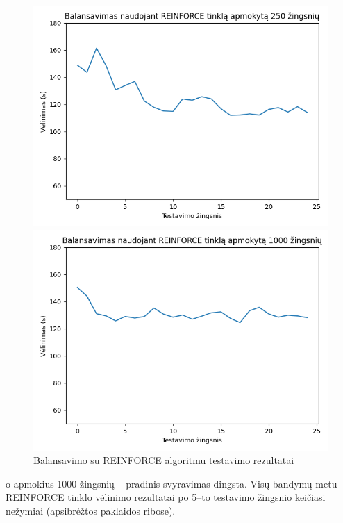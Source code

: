 \documentclass{VUMIFPSbakalaurinis}
\begin{document}
\begin{figure}[h!]
\begin{minipage}[b]{0.45\textwidth}
    \end{minipage}
    \hspace{1mm}
    \begin{minipage}[b]{0.45\textwidth}
        \includegraphics[width=\textwidth]{img/reinforce_250_2.png}
    \end{minipage}    
    \hspace{1mm}
    \begin{minipage}[b]{0.45\textwidth}
        \includegraphics[width=\textwidth]{img/reinforce_1000_2.png}
    \end{minipage}
    \caption{Balansavimo su REINFORCE algoritmu testavimo rezultatai}
    \label{reinforce–rez}
\end{figure}
o apmokius 1000 žingsnių – pradinis svyravimas dingsta. Visų bandymų metu REINFORCE tinklo vėlinimo rezultatai po 5–to testavimo žingsnio keičiasi nežymiai (apsibrėžtos paklaidos ribose).
\end{document}
